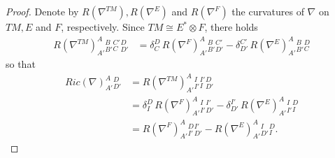 \documentclass[11pt]{amsart}
\begin{document}
\begin{proof}
Denote by $R(\nabla^{TM}),R(\nabla^E)$ and $R(\nabla^F)$ the curvatures of $\nabla$ on $TM,E$ and $F$, respectively. Since $TM\cong E^*\otimes F$, there holds
\begin{align*}
        R(\nabla^{TM})^A_{A'}{}^B_{B'}{}^{C'}_{C}{}^D_{D'}&=\delta^D_C\, R(\nabla^F)^A_{A'}{}^B_{B'}{}^{C'}_{D'}-\delta^{C'}_{D'}\,R(\nabla^E)^A_{A'}{}^B_{B'}{}^{D}_{C}
    \end{align*}
so that
\begin{align*}
Ric(\nabla)^A_{A'}{}^D_{D'}&=R(\nabla^{TM})^A_{A'}{}^I_{I'}{}^{I'}_{I}{}^D_{D'}\nonumber\\
&=\delta^D_I\,R(\nabla^F)^A_{A'}{}^I_{I'}{}^{I'}_{D'}-\delta^{I'}_{D'}\,R(\nabla^E)^A_{A'}{}^I_{I'}{}^{D}_{I}\nonumber\\
    &=R(\nabla^F)^A_{A'}{}^D_{I'}{}^{I'}_{D'}-R(\nabla^E)^A_{A'}{}^I_{D'}{}^{D}_{I}.\label{Ric}
\end{align*}




\end{proof}
\end{document}
